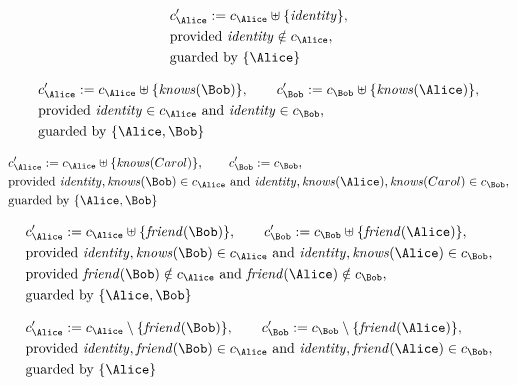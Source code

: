 \begin{align*}
&
c'_
{
\Alice
}
 := 
c_
{
\Alice
}
 \uplus 
\{
\mathit{
identity
}
\}
,\\
&
\text{provided } 
\mathit{
identity
}
 \notin c_
{
\Alice
}
,\\
&
\text{guarded by } \{
\Alice
\}
\end{align*}

\begin{align*}
&
c'_
{
\Alice
}
 := 
c_
{
\Alice
}
 \uplus 
\{
\mathit{
knows
}
(
\Bob
)
\}
, \qquad 
c'_
{
\Bob
}
 := 
c_
{
\Bob
}
 \uplus 
\{
\mathit{
knows
}
(
\Alice
)
\}
,\\
&
\text{provided } 
\mathit{
identity
}
 \in c_
{
\Alice
}
 \text{ and } 
\mathit{
identity
}
 \in c_
{
\Bob
}
,\\
&
\text{guarded by } \{
\Alice
,
\Bob
\}
\end{align*}

\begin{align*}
&
c'_
{
\Alice
}
 := 
c_
{
\Alice
}
 \uplus 
\{
\mathit{
knows
}
(
Carol
)
\}
, \qquad 
c'_
{
\Bob
}
 := 
c_
{
\Bob
}
,\\
&
\text{provided } 
\mathit{
identity
}
,
\mathit{
knows
}
(
\Bob
)
 \in c_
{
\Alice
}
 \text{ and } 
\mathit{
identity
}
,
\mathit{
knows
}
(
\Alice
)
,
\mathit{
knows
}
(
Carol
)
 \in c_
{
\Bob
}
,\\
&
\text{guarded by } \{
\Alice
,
\Bob
\}
\end{align*}

\begin{align*}
&
c'_
{
\Alice
}
 := 
c_
{
\Alice
}
 \uplus 
\{
\mathit{
friend
}
(
\Bob
)
\}
, \qquad 
c'_
{
\Bob
}
 := 
c_
{
\Bob
}
 \uplus 
\{
\mathit{
friend
}
(
\Alice
)
\}
,\\
&
\text{provided } 
\mathit{
identity
}
,
\mathit{
knows
}
(
\Bob
)
 \in c_
{
\Alice
}
 \text{ and } 
\mathit{
identity
}
,
\mathit{
knows
}
(
\Alice
)
 \in c_
{
\Bob
}
,\\
&
\text{provided } 
\mathit{
friend
}
(
\Bob
)
 \notin c_
{
\Alice
}
 \text{ and } 
\mathit{
friend
}
(
\Alice
)
 \notin c_
{
\Bob
}
,\\
&
\text{guarded by } \{
\Alice
,
\Bob
\}
\end{align*}

\begin{align*}
&
c'_
{
\Alice
}
 := 
c_
{
\Alice
}
 \setminus 
\{
\mathit{
friend
}
(
\Bob
)
\}
, \qquad 
c'_
{
\Bob
}
 := 
c_
{
\Bob
}
 \setminus 
\{
\mathit{
friend
}
(
\Alice
)
\}
,\\
&
\text{provided } 
\mathit{
identity
}
,
\mathit{
friend
}
(
\Bob
)
 \in c_
{
\Alice
}
 \text{ and } 
\mathit{
identity
}
,
\mathit{
friend
}
(
\Alice
)
 \in c_
{
\Bob
}
,\\
&
\text{guarded by } \{
\Alice
\}
\end{align*}
